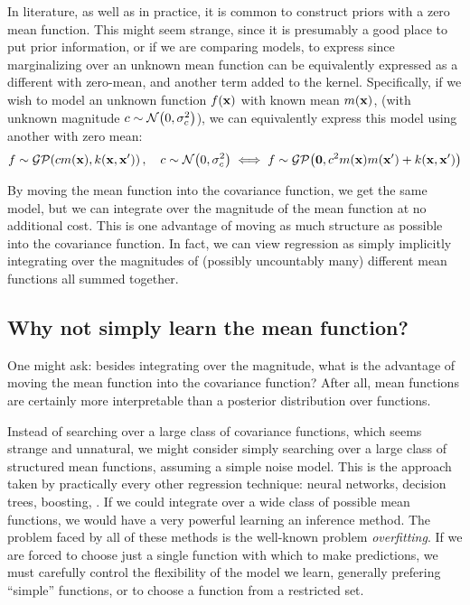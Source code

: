 In literature, as well as in practice, it is common to construct \gp{} priors with a zero mean function.
This might seem strange, since it is presumably a good place to put prior information, or if we are comparing models, to express  since marginalizing over an unknown mean function can be equivalently expressed as a different \gp{} with zero-mean, and another term added to the kernel.
Specifically, if we wish to model an unknown function $f({\bf{x}})$ with known mean $m({\bf{x}})$, (with unknown magnitude $c \sim \mathcal{N}\!\left(0,\sigma^2_c\right)$), we can equivalently express this model using another \gp{} with zero mean:
%
\begin{align}
f \sim \mathcal{GP}\!\left(c m({\bf{x}}),k({\bf{x}},{\bf{x}}')\right), \quad c \sim \mathcal{N}\!\left(0,\sigma^2_c\right)
\iff f \sim \mathcal{GP}\!\left( {\bf{0}} , c^2 m({\bf{x}}) m({\bf{x}}') + k({\bf{x}},{\bf{x}}')\right)
\end{align}

By moving the mean function into the covariance function, we get the same model, but we can integrate over the magnitude of the mean function at no additional cost.
This is one advantage of moving as much structure as possible into the covariance function.
In fact, we can view \gp{} regression as simply implicitly integrating over the magnitudes of (possibly uncountably many) different mean functions all summed together.

\subsection{Why not simply learn the mean function?}
One might ask: besides integrating over the magnitude, what is the advantage of moving the mean function into the covariance function?
After all, mean functions are certainly more interpretable than a posterior distribution over functions.

Instead of searching over a large class of covariance functions, which seems strange and unnatural, we might consider simply searching over a large class of structured mean functions, assuming a simple \iid noise model.
This is the approach taken by practically every other regression technique: neural networks, decision trees, boosting, \etc.
If we could integrate over a wide class of possible mean functions, we would have a very powerful learning an inference method.
The problem faced by all of these methods is the well-known problem \emph{overfitting}.
If we are forced to choose just a single function with which to make predictions, we must carefully control the flexibility of the model we learn, generally prefering ``simple'' functions, or to choose a function from a restricted set.

